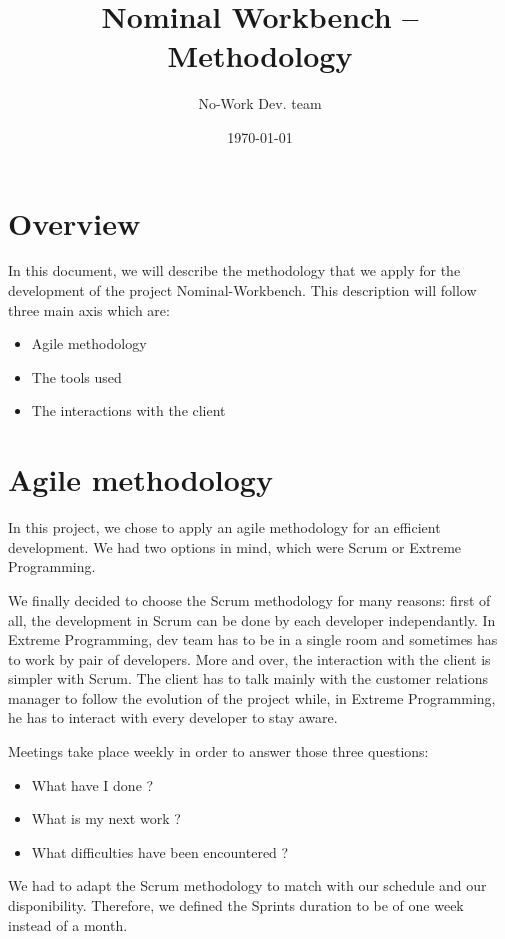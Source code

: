 \documentclass[11pt,a4paper]{article}
\title{Nominal Workbench -- Methodology}
\author{No-Work Dev. team}
\date\today
\begin{document}
\maketitle
\clearpage

\section{Overview}

In this document, we will describe the methodology that we apply for
the development of the project Nominal-Workbench. This description
will follow three main axis which are:
\begin{itemize}
\item Agile methodology
\item The tools used
\item The interactions with the client
\end{itemize}

\section{Agile methodology}

In this project, we chose to apply an agile methodology for an
efficient development. We had two options in mind, which were Scrum or
Extreme Programming.

We finally decided to choose the Scrum methodology for many reasons:
first of all, the development in Scrum can be done by each developer
independantly. In Extreme Programming, dev team has to be in a single
room and sometimes has to work by pair of developers. More and over,
the interaction with the client is simpler with Scrum. The client has
to talk mainly with the customer relations manager to follow the
evolution of the project while, in Extreme Programming, he has to
interact with every developer to stay aware.

Meetings take place weekly in order to answer those three questions:
\begin{itemize}
\item What have I done ?
\item What is my next work ?
\item What difficulties have been encountered ?
\end{itemize}

We had to adapt the Scrum methodology to match with our schedule and
our disponibility. Therefore, we defined the Sprints duration to be of
one week instead of a month.
\end{document}
